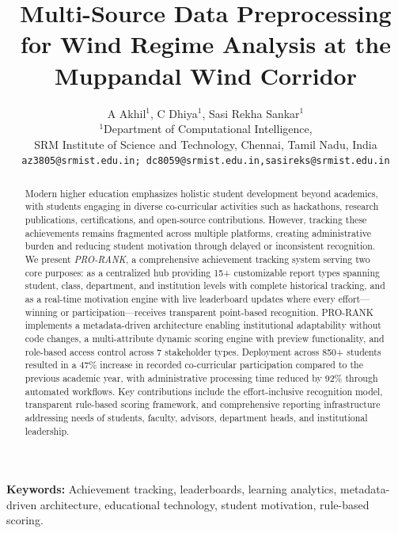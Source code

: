 \documentclass[12pt]{article}
\begin{document}
\title{Multi-Source Data Preprocessing for Wind Regime Analysis at the Muppandal Wind Corridor}

\author{%
A Akhil$^{1}$, C Dhiya$^{1}$, Sasi Rekha Sankar$^{1}$\\
\small $^{1}$Department of Computational Intelligence,\\
\small SRM Institute of Science and Technology, Chennai, Tamil Nadu, India\\
\small \texttt{az3805@srmist.edu.in; dc8059@srmist.edu.in,sasireks@srmist.edu.in}\\
}

\date{}

\maketitle

\begin{abstract}
Modern higher education emphasizes holistic student development beyond academics, with students engaging in diverse co-curricular activities such as hackathons, research publications, certifications, and open-source contributions. However, tracking these achievements remains fragmented across multiple platforms, creating administrative burden and reducing student motivation through delayed or inconsistent recognition. We present \textit{PRO-RANK}, a comprehensive achievement tracking system serving two core purposes: as a centralized hub providing 15+ customizable report types spanning student, class, department, and institution levels with complete historical tracking, and as a real-time motivation engine with live leaderboard updates where every effort—winning or participation—receives transparent point-based recognition. PRO-RANK implements a metadata-driven architecture enabling institutional adaptability without code changes, a multi-attribute dynamic scoring engine with preview functionality, and role-based access control across 7 stakeholder types. Deployment across 850+ students resulted in a 47\% increase in recorded co-curricular participation compared to the previous academic year, with administrative processing time reduced by 92\% through automated workflows. Key contributions include the effort-inclusive recognition model, transparent rule-based scoring framework, and comprehensive reporting infrastructure addressing needs of students, faculty, advisors, department heads, and institutional leadership.
\end{abstract}
\vspace{0.5em}
\noindent\textbf{Keywords:} Achievement tracking, leaderboards, learning analytics, metadata-driven architecture, educational technology, student motivation, rule-based scoring.
\end{document}

